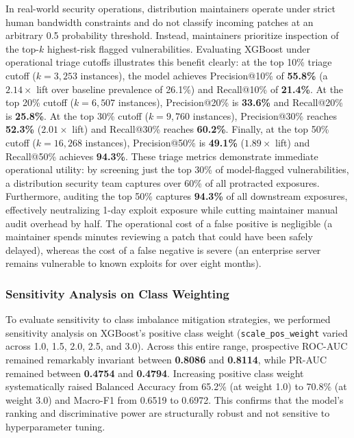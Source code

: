 \documentclass[final,5p,times,twocolumn]{elsarticle}
\begin{document}
In real-world security operations, distribution maintainers operate under strict human bandwidth constraints and do not classify incoming patches at an arbitrary 0.5 probability threshold. Instead, maintainers prioritize inspection of the top-$k$ highest-risk flagged vulnerabilities. Evaluating XGBoost under operational triage cutoffs illustrates this benefit clearly: at the top 10\% triage cutoff ($k = 3,253$ instances), the model achieves Precision@10\% of \textbf{55.8\%} (a $2.14\times$ lift over baseline prevalence of 26.1\%) and Recall@10\% of \textbf{21.4\%}. At the top 20\% cutoff ($k = 6,507$ instances), Precision@20\% is \textbf{33.6\%} and Recall@20\% is \textbf{25.8\%}. At the top 30\% cutoff ($k = 9,760$ instances), Precision@30\% reaches \textbf{52.3\%} ($2.01\times$ lift) and Recall@30\% reaches \textbf{60.2\%}. Finally, at the top 50\% cutoff ($k = 16,268$ instances), Precision@50\% is \textbf{49.1\%} ($1.89\times$ lift) and Recall@50\% achieves \textbf{94.3\%}.
These triage metrics demonstrate immediate operational utility: by screening just the top 30\% of model-flagged vulnerabilities, a distribution security team captures over 60\% of all protracted exposures. Furthermore, auditing the top 50\% captures \textbf{94.3\%} of all downstream exposures, effectively neutralizing 1-day exploit exposure while cutting maintainer manual audit overhead by half. The operational cost of a false positive is negligible (a maintainer spends minutes reviewing a patch that could have been safely delayed), whereas the cost of a false negative is severe (an enterprise server remains vulnerable to known exploits for over eight months).

\subsubsection{Sensitivity Analysis on Class Weighting}
To evaluate sensitivity to class imbalance mitigation strategies, we performed sensitivity analysis on XGBoost's positive class weight (\texttt{scale\_pos\_weight} varied across 1.0, 1.5, 2.0, 2.5, and 3.0). Across this entire range, prospective ROC-AUC remained remarkably invariant between \textbf{0.8086} and \textbf{0.8114}, while PR-AUC remained between \textbf{0.4754} and \textbf{0.4794}. Increasing positive class weight systematically raised Balanced Accuracy from 65.2\% (at weight 1.0) to 70.8\% (at weight 3.0) and Macro-F1 from 0.6519 to 0.6972. This confirms that the model's ranking and discriminative power are structurally robust and not sensitive to hyperparameter tuning.
\end{document}
